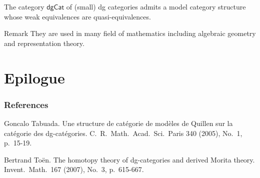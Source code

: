 \documentclass[dvipdfmx,11pt]{beamer}
\theoremstyle{definition}
\begin{document}
\begin{frame}

\begin{theorem}[Tabuada]
		The category $\mathsf{dgCat}$ of (small) dg categories admits a model category structure whose weak equivalences are quasi-equivalences.
	\end{theorem}

\begin{alertblock}{Remark}
They are used in many field of mathematics including algebraic geometry and representation theory.

\end{alertblock}
\end{frame}


\section{Epilogue}

\begin{frame}
	\frametitle{References}
	
	\small
	\begin{enumerate}[{[1]}]
		\item Goncalo Tabuada. Une structure de catégorie de modèles de Quillen sur la catégorie des dg-catégories. C.\ R.\ Math.\ Acad.\ Sci.\ Paris 340 (2005), No.\ 1, p.\ 15-19.
		
		\item Bertrand To\"en. The homotopy theory of dg-categories and derived Morita theory. Invent.\ Math.\ 167 (2007), No.\ 3, p.\ 615-667.
		
	\end{enumerate}
	
\end{frame}
\end{document}
